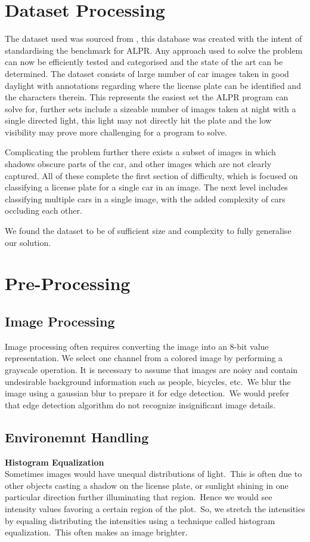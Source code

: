 \documentclass[a4paper,twoside,10pt]{report}
\begin{document}
\section{Dataset Processing}
The dataset used was sourced from \citet*{KrauseStarkDengFei-Fei_3DRR2013}, this database was created with the intent of standardising the benchmark for ALPR. Any approach used to solve the problem can now be efficiently tested and categorised and the state of the art can be determined. The dataset consists of large number of car images taken in good daylight with annotations regarding where the license plate can be identified and the characters therein. This represents the easiest set the ALPR program can solve for, further sets include a sizeable number of images taken at night with a single directed light, this light may not directly hit the plate and the low visibility may prove more challenging for a program to solve. \par Complicating the problem further there exists a subset of images in which shadows obscure parts of the car, and other images which are not clearly captured. All of these complete the first section of difficulty, which is focused on classifying a license plate for a single car in an image. The next level includes classifying multiple cars in a single image, with the added complexity of cars occluding each other.\par
We found the dataset to be of sufficient size and complexity to fully generalise our solution.

\section{Pre-Processing}
\subsection{Image Processing}
Image processing often requires converting the image into an 8-bit value representation.
We select one channel from a colored image by performing a grayscale operation.
It is necessary to assume that images are noisy and contain undesirable background information such as people, bicycles, etc.\
We blur the image using a gaussian blur to prepare it for edge detection.\ 
We would prefer that edge detection algorithm do not recognize insignificant image details.\

\subsection{Environemnt Handling}
\textbf{Histogram Equalization}\\
Sometimes images would have unequal distributions of light.\ 
This is often due to other objects casting a shadow on the license plate, or sunlight shining in one particular direction further illuminating that region.\ 
Hence we would see intensity values favoring a certain region of the plot.\ 
So, we stretch the intensities by equaling distributing the intensities using a technique called histogram equalization.\ 
This often makes an image brighter. \\ [3pt]
\end{document}
